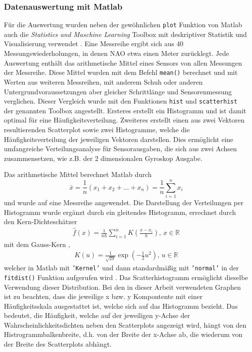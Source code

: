 \subsubsection*{Datenauswertung mit Matlab}
Für die Auswertung wurden neben der gewöhnlichen \texttt{plot} Funktion von Matlab \cite{matlab} auch die \textit{Statistics and Maschine Learning} Toolbox mit deskriptiver Statistik und Visualisierung verwendet \cite{toolbox}. 
Eine Messreihe ergibt sich aus 40 Messungswiederholungen, in denen NAO etwa einen Meter zurücklegt. Jede Auswertung enthält das arithmetische Mittel eines Sensors von allen Messungen der Messreihe. Diese Mittel wurden mit dem Befehl \texttt{mean()} berechnet und mit Werten aus weiteren Messreihen, mit anderem Schuh oder anderen Untergrundvoraussetzungen aber gleicher Schrittlänge und Sensorenmessung verglichen. Dieser Vergleich wurde mit den Funktionen \texttt{hist} und \texttt{scatterhist} der genannten Toolbox angestellt. Ersteres erstellt ein Histogramm und ist damit optimal für eine Häufigkeitsverteilung. Zweiteres erstellt einen aus zwei Vektoren resultierenden Scatterplot sowie zwei Histogramme, welche die Häufigkeitsverteilung der jeweiligen Vektoren darstellen. Dies ermöglicht eine umfangreiche Verteilungsanalyse für Sensorausgaben, die sich aus zwei Achsen zusammensetzen, wie z.B. der 2 dimensionalen Gyroskop Ausgabe.

Das arithmetische Mittel berechnet Matlab durch \cite[S.50]{statistik_Ludwig}
\begin{equation} \label{mean}
	\bar{x} = \frac{1}{n} (x_1 + x_2 + \dots + x_n) = \frac{1}{n}\sum_{i=1}^{n}x_i
\end{equation}
und wurde auf eine Messreihe angewendet. Die Darstellung der Verteilungen per Histogramm wurde ergänzt durch ein gleitendes Histogramm, errechnet durch den Kern-Dichteschätzer \cite[S.93]{statistik_Ludwig}
\begin{align} \label{pdf}
	\hat{f}(x)=\frac{1}{nh} \sum_{i=1}^{n}K\left(\frac{x - x_i}{h}\right),\, x \in \mathds{R}
\end{align}
mit dem Gauss-Kern \cite[S.93]{statistik_Ludwig}, 
\begin{align}
	K(u) = \frac{1}{\sqrt{2\pi}} \exp\left(-\frac{1}{2}u^2\right),\, u \in \mathds{R}
\end{align}
welcher in Matlab mit \texttt{'Kernel'} und dann standardmäßig mit \texttt{'normal'} in der \texttt{fitdist()} Funktion aufgerufen wird \cite{kernel-distribution} \cite{fitdist}. Das Scatterhistogramm ermöglicht dieselbe Verwendung dieser Distribution. Bei den in dieser Arbeit verwendeten Graphen ist zu beachten, dass die jeweilige x bzw. y Kompontente mit einer Häufigkeitsskala ausgestattet ist, welche sich auf das Histogramm bezieht. Das bedeutet, die Häufigkeit, welche auf der jeweiligen y-Achse der Wahrscheinlichkeitsdichten neben den Scatterplots angezeigt wird, hängt von den Histrogrammbalkenbreite, d.h. von der Breite der x-Achse ab, die wiederum von der Breite des Scatterplots abhängt.  

